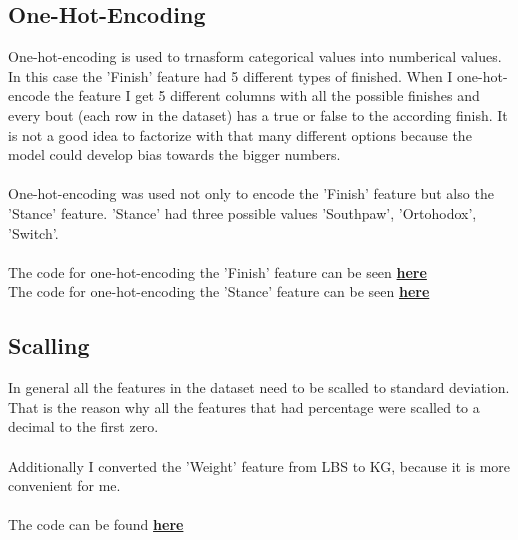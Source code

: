 \documentclass{article}
\begin{document}
 \subsection{One-Hot-Encoding} %
  One-hot-encoding is used to trnasform categorical values into numberical values. In this case the 'Finish' feature had 5 different types of finished. When I one-hot-encode 
  the feature I get 5 different columns with all the possible finishes and every bout (each row in the dataset) has a true or false to the according finish. It is not a good idea 
  to factorize with that many different options because the model could develop bias towards the bigger numbers.\\\\ 
  One-hot-encoding was used not only to encode the 'Finish' feature but also the 'Stance' feature. 'Stance' had three possible values 'Southpaw', 'Ortohodox', 'Switch'.\\\\
  The code for one-hot-encoding the 'Finish' feature can be seen \href{fig:One_hot_encoding_finish}{\textbf{here}}\\ 
  The code for one-hot-encoding the 'Stance' feature can be seen \href{fig:One_hot_encoding_stance}{\textbf{here}}
  \subsection{Scalling}
  In general all the features in the dataset need to be scalled to standard deviation. That is the reason why all the features that had percentage were scalled to a decimal to the first zero.\\\\ 
  Additionally I converted the 'Weight' feature from LBS to KG, because it is more convenient for me. \\\\
  The code can be found \href{fig:converting_weight}{\textbf{here}}
\end{document}
